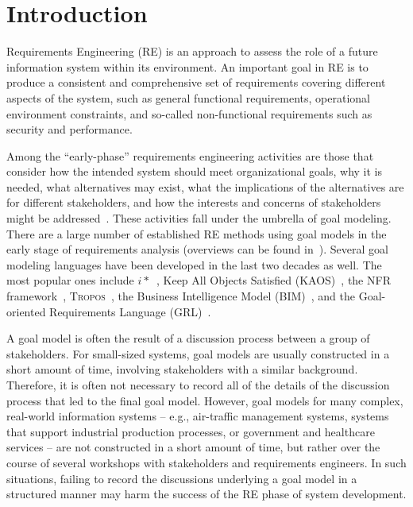\section{Introduction}
\label{sect:introduction}

Requirements Engineering (RE) is an approach to assess the role of a future information system within its environment. An important goal in RE is to produce a consistent and comprehensive set of requirements covering different aspects of the system, such as general functional requirements, operational environment constraints, and so-called non-functional requirements such as security and performance. 

Among the ``early-phase'' requirements engineering activities are those that consider how the intended system should meet organizational goals, why it is needed, what alternatives may exist, what the implications of the alternatives are for different stakeholders, and how the interests and concerns of stakeholders might be addressed~\cite{yu1997towards}. These activities fall under the umbrella of goal modeling. There are a large number of established RE methods using goal models in the early stage of requirements analysis (overviews can be found in~\cite{kavakliL05,van2001goal}). Several goal modeling languages have been developed in the last two decades as well. The most popular ones include $i*$~\cite{yu1997towards}, Keep All Objects Satisfied (KAOS)~\cite{van2008requirements}, the NFR framework~\cite{chung2012non}, \textsc{Tropos}~\cite{giorgini2005goal}, the Business Intelligence Model (BIM)~\cite{horkoff2014strategic}, and the Goal-oriented Requirements Language (GRL)~\cite{Amyot:2010:EGM:1841349.1841356}.

A goal model is often the result of a discussion process between a group of stakeholders. For small-sized systems, goal models are usually constructed in a short amount of time, involving stakeholders with a similar background. Therefore, it is often not necessary to record all of the details of the discussion process that led to the final goal model. However, goal models for many complex, real-world information systems -- e.g., air-traffic management systems, systems that support industrial production processes, or government and healthcare services -- are not constructed in a short amount of time, but rather over the course of several workshops with stakeholders and requirements engineers. In such situations, failing to record the discussions underlying a goal model in a structured manner may harm the success of the RE phase of system development. 

